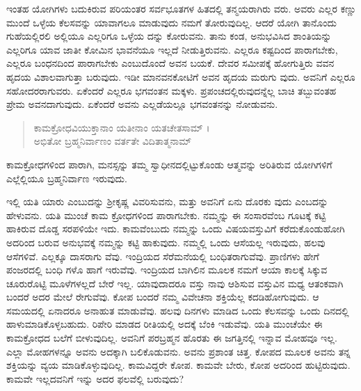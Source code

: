 ಇಂತಹ ಯೋಗಿಗಳು ಬದುಕಿರುವ ಪರಿಯಂತರ ಸರ್ವಭೂತಗಳ ಹಿತದಲ್ಲಿ ತನ್ಮಯರಾಗಿರು ವರು. ಅವರು ಎಲ್ಲರ ಕಣ್ಣು ಮುಂದೆ ಒಳ್ಳೆಯ ಕೆಲಸವನ್ನು ಯಾವಾಗಲೂ ಮಾಡುವುದು ನಮಗೆ ತೋರುವುದಿಲ್ಲ. ಆದರೆ ಯೋಗಿ ತಾನೊಂದು ಗುಹೆಯಲ್ಲಿರಲಿ ಅಲ್ಲಿಯೂ ಎಲ್ಲರಿಗೂ ಒಳ್ಳೆಯ ದನ್ನು ಕೋರುವನು. ತಾನು ಕಂಡ, ಅನುಭವಿಸಿದ ಶಾಂತಿಯನ್ನು ಎಲ್ಲರಿಗೂ ಯಾವ ಜಾತೀ ಕೋಮಿನ ಭಾವನೆಯೂ ಇಲ್ಲದೆ ನೀಡುತ್ತಿರುವನು. ಎಲ್ಲರೂ ಕಷ್ಟದಿಂದ ಪಾರಾಗಬೇಕು, ಎಲ್ಲರೂ ಬಂಧನದಿಂದ ಪಾರಾಗಬೇಕು ಎಂಬುದೊಂದೆ ಅವನ ಬಯಕೆ. ದೇವರ ಸಮೀಪಕ್ಕೆ ಹೋಗುತ್ತಿರು ವವನ ಹೃದಯ ವಿಶಾಲವಾಗುತ್ತಾ ಬರುವುದು. ಇಡೀ ಮಾನವನಕೋಟಿಗೆ ಅವನ ಹೃದಯ ಮರುಗು ವುದು. ಅವನಿಗೆ ಎಲ್ಲರೂ ಸಹೋದರರಾಗುವರು. ಏಕೆಂದರೆ ಎಲ್ಲರೂ ಭಗವಂತನ ಮಕ್ಕಳು. ಪ್ರಪಂಚದಲ್ಲಿರುವುದನ್ನೆಲ್ಲ ಬಾಚಿ ತಬ್ಬುವಂತಹ ಪ್ರೇಮ ಅವನದಾಗುವುದು. ಏಕೆಂದರೆ ಅವನು ಎಲ್ಲಡೆಯಲ್ಲೂ ಭಗವಂತನನ್ನು ನೋಡುವನು.

\begin{verse}
ಕಾಮಕ್ರೋಧವಿಯುಕ್ತಾನಾಂ ಯತೀನಾಂ ಯತಚೇತಸಾಮ್ ।\\ಅಭಿತೋ ಬ್ರಹ್ಮನಿರ್ವಾಣಂ ವರ್ತತೇ ವಿದಿತಾತ್ಮನಾಮ್ 
\end{verse}

{\small ಕಾಮಕ್ರೋಧಗಳಿಂದ ಪಾರಾಗಿ, ಮನಸ್ಸನ್ನು ತಮ್ಮ ಸ್ವಾಧೀನದಲ್ಲಿಟ್ಟುಕೊಂಡು ಆತ್ಮವನ್ನು ಅರಿತಿರುವ ಯೋಗಿಗಳಿಗೆ ಎಲ್ಲೆಲ್ಲಿಯೂ ಬ್ರಹ್ಮನಿರ್ವಾಣ ಇರುವುದು.}

ಇಲ್ಲಿ ಯತಿ ಯಾರು ಎಂಬುದನ್ನು ಶ್ರೀಕೃಷ್ಣ ವಿವರಿಸುವನು, ಮತ್ತು ಅವನಿಗೆ ಏನು ದೊರಕು ವುದು ಎಂಬದನ್ನು ಹೇಳುವನು. ಯತಿ ಮುಂಚೆ ಕಾಮ ಕ್ರೋಧಗಳಿಂದ ಪಾರಾಗಬೇಕು. ನಮ್ಮನ್ನು ಈ ಸಂಸಾರವೆಂಬ ಗೂಟಕ್ಕೆ ಕಟ್ಟಿ ಹಾಕಿರುವ ದೊಡ್ಡ ಸರಪಳಿಯೇ ಇದು. ಕಾಮವೆಂಬುದು ನಮ್ಮನ್ನು ಒಂದು ವಿಷಯವಸ್ತುವಿಗೆ ಕರೆದುಕೊಂಡುಹೋಗಿ ಅದರಿಂದ ಬರುವ ಅನುಭವಕ್ಕೆ ನಮ್ಮನ್ನು ಕಟ್ಟಿ ಹಾಕುವುದು. ನಮ್ಮಲ್ಲಿ ಒಂದು ಆಸೆಯಲ್ಲ ಇರುವುದು, ಹಲವು ಆಸೆಗಳಿವೆ. ಎಲ್ಲಕ್ಕೂ ದಾಸರಾಗು ವೆವು. ಇಂದ್ರಿಯದ ಸೆರೆಮನೆಯಲ್ಲಿ ಬಂಧಿತರಾಗುವೆವು. ಪ್ರಾಣಿಗಳು ಹೇಗೆ ಪಂಜರದಲ್ಲಿ ಬಂಧಿ ಗಳೊ ಹಾಗೆ ಇರುವೆವು. ಇಂದ್ರಿಯದ ಬಾಗಿಲಿನ ಮೂಲಕ ನಮಗೆ ಆಯಾ ಕಾಲಕ್ಕೆ ಸಿಕ್ಕುವ ಚೂರುರೊಟ್ಟಿ ಮೂಳೆಗಳಲ್ಲದೆ ಬೇರೆ ಇಲ್ಲ. ಯಾವುದಾದರೂ ವಸ್ತು ನಾವು ಆಶಿಸುವ ವಸ್ತುವಿನ ಮಧ್ಯ ಆತಂಕವಾಗಿ ಬಂದರೆ ಅದರ ಮೇಲೆ ರೇಗುವೆವು. ಕೋಪ ಬಂದರೆ ನಮ್ಮ ವಿವೇಚನಾ ಶಕ್ತಿಯೆಲ್ಲ ಕದಡಿಹೋಗುವುದು. ಆ ಸಮಯದಲ್ಲಿ ಏನಾದರೂ ಅನಾಹುತ ಮಾಡುವೆವು. ಹಲವು ದಿನಗಳು ಮಾಡಿದ ಒಂದು ಕೆಲಸವನ್ನು ಒಂದು ದಿನದಲ್ಲಿ ಹಾಳುಮಾಡಿಕೊಳ್ಳಬಹುದು. ರಿಪೇರಿ ಮಾಡದ ರೀತಿಯಲ್ಲಿ ಅದಕ್ಕೆ ಬೆಂಕಿ ಇಡುವೆವು. ಯತಿ ಮುಂಚೆಯೇ ಈ ಕಾಮಕ್ರೋಧದ ಬಲೆಗೆ ಬೀಳುವುದಿಲ್ಲ. ಅವನಿಗೆ ಪರಬ್ರಹ್ಮನ ಹೊರತು ಈ ಜಗತ್ತಿನಲ್ಲಿ ಇನ್ನಾವ ಮೋಹವೂ ಇಲ್ಲ. ಎಲ್ಲಾ ಮೋಹಗಳನ್ನೂ ಅವನು ಅದಕ್ಕಾಗಿ ಬಲಿಕೊಡುವನು. ಅವನು ಪ್ರಶಾಂತ ಚಿತ್ತ. ಕೋಪದ ಮೂಲಕ ಅವನು ತನ್ನ ಶಕ್ತಿಯನ್ನು ವ್ಯಯ ಮಾಡಿಕೊಳ್ಳುವುದಿಲ್ಲ. ಕಾಮವಿದ್ದರೇ ಕೋಪ. ಕಾಮವೇ ಬೇರು, ಕೋಪ ಅದರಿಂದ ಹುಟ್ಟಿರುವುದು. ಕಾಮವೇ ಇಲ್ಲದವನಿಗೆ ಇನ್ನು ಅದರ ಫಲವೆಲ್ಲಿ ಬರುವುದು?

